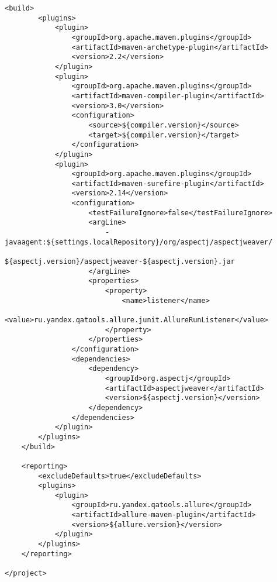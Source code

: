 \begin{lstlisting}[style=XML, caption=Пример подключения Allure к JUnit тестам с использованием Maven]
    <build>
        <plugins>
            <plugin>
                <groupId>org.apache.maven.plugins</groupId>
                <artifactId>maven-archetype-plugin</artifactId>
                <version>2.2</version>
            </plugin>
            <plugin>
                <groupId>org.apache.maven.plugins</groupId>
                <artifactId>maven-compiler-plugin</artifactId>
                <version>3.0</version>
                <configuration>
                    <source>${compiler.version}</source>
                    <target>${compiler.version}</target>
                </configuration>
            </plugin>
            <plugin>
                <groupId>org.apache.maven.plugins</groupId>
                <artifactId>maven-surefire-plugin</artifactId>
                <version>2.14</version>
                <configuration>
                    <testFailureIgnore>false</testFailureIgnore>
                    <argLine>
                        -javaagent:${settings.localRepository}/org/aspectj/aspectjweaver/
                        ${aspectj.version}/aspectjweaver-${aspectj.version}.jar
                    </argLine>
                    <properties>
                        <property>
                            <name>listener</name>
                            <value>ru.yandex.qatools.allure.junit.AllureRunListener</value>
                        </property>
                    </properties>
                </configuration>
                <dependencies>
                    <dependency>
                        <groupId>org.aspectj</groupId>
                        <artifactId>aspectjweaver</artifactId>
                        <version>${aspectj.version}</version>
                    </dependency>
                </dependencies>
            </plugin>
        </plugins>
    </build>

    <reporting>
        <excludeDefaults>true</excludeDefaults>
        <plugins>
            <plugin>
                <groupId>ru.yandex.qatools.allure</groupId>
                <artifactId>allure-maven-plugin</artifactId>
                <version>${allure.version}</version>
            </plugin>
        </plugins>
    </reporting>

</project>
\end{lstlisting}